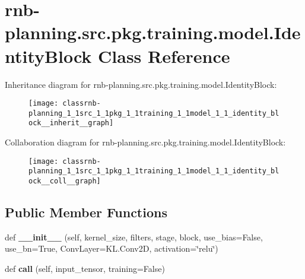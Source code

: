 \hypertarget{classrnb-planning_1_1src_1_1pkg_1_1training_1_1model_1_1_identity_block}{}\section{rnb-\/planning.src.\+pkg.\+training.\+model.\+Identity\+Block Class Reference}
\label{classrnb-planning_1_1src_1_1pkg_1_1training_1_1model_1_1_identity_block}


Inheritance diagram for rnb-\/planning.src.\+pkg.\+training.\+model.\+Identity\+Block\+:\nopagebreak
\begin{figure}[H]
\begin{center}
\leavevmode
\texttt{[image: classrnb-planning\_1\_1src\_1\_1pkg\_1\_1training\_1\_1model\_1\_1\_identity\_block\_\_inherit\_\_graph]}
\end{center}
\end{figure}


Collaboration diagram for rnb-\/planning.src.\+pkg.\+training.\+model.\+Identity\+Block\+:\nopagebreak
\begin{figure}[H]
\begin{center}
\leavevmode
\texttt{[image: classrnb-planning\_1\_1src\_1\_1pkg\_1\_1training\_1\_1model\_1\_1\_identity\_block\_\_coll\_\_graph]}
\end{center}
\end{figure}
\subsection*{Public Member Functions}
\begin{DoxyCompactItemize}
\item 
\mbox{\label{classrnb-planning_1_1src_1_1pkg_1_1training_1_1model_1_1_identity_block_a0a92c5d20625b4d04e554e9ca45e12bb}} 
def {\bfseries \+\_\+\+\_\+init\+\_\+\+\_\+} (self, kernel\+\_\+size, filters, stage, block, use\+\_\+bias=False, use\+\_\+bn=True, Conv\+Layer=K\+L.\+Conv2D, activation=\char`\"{}relu\char`\"{})
\item 
\mbox{\label{classrnb-planning_1_1src_1_1pkg_1_1training_1_1model_1_1_identity_block_aece525994523d4ce384d501164e3f6e9}} 
def {\bfseries call} (self, input\+\_\+tensor, training=False)
\end{DoxyCompactItemize}
